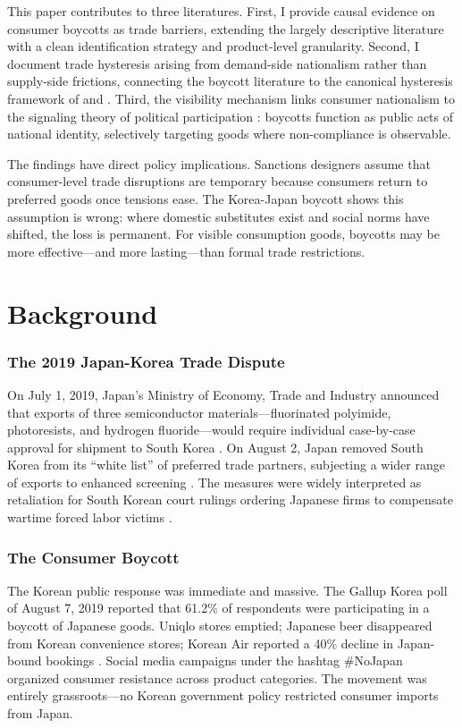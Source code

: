 \documentclass[12pt]{article}
\begin{document}
This paper contributes to three literatures. First, I provide causal evidence on consumer boycotts as trade barriers, extending the largely descriptive literature \citep{pandya2011trade, heilmann2016political, fuchs2015understanding} with a clean identification strategy and product-level granularity. Second, I document trade hysteresis arising from demand-side nationalism rather than supply-side frictions, connecting the boycott literature to the canonical hysteresis framework of \citet{baldwin1988hysteresis} and \citet{dixit1989entry}. Third, the visibility mechanism links consumer nationalism to the signaling theory of political participation \citep{dellavigna2017voting}: boycotts function as public acts of national identity, selectively targeting goods where non-compliance is observable.

The findings have direct policy implications. Sanctions designers assume that consumer-level trade disruptions are temporary because consumers return to preferred goods once tensions ease. The Korea-Japan boycott shows this assumption is wrong: where domestic substitutes exist and social norms have shifted, the loss is permanent. For visible consumption goods, boycotts may be more effective---and more lasting---than formal trade restrictions.


\section{Background}

\subsubsection*{The 2019 Japan-Korea Trade Dispute} On July 1, 2019, Japan's Ministry of Economy, Trade and Industry announced that exports of three semiconductor materials---fluorinated polyimide, photoresists, and hydrogen fluoride---would require individual case-by-case approval for shipment to South Korea \citep{reuters2019japan}. On August 2, Japan removed South Korea from its ``white list'' of preferred trade partners, subjecting a wider range of exports to enhanced screening \citep{bbc2019japan}. The measures were widely interpreted as retaliation for South Korean court rulings ordering Japanese firms to compensate wartime forced labor victims \citep{chung2019politics}.

\subsubsection*{The Consumer Boycott} The Korean public response was immediate and massive. The Gallup Korea poll of August 7, 2019 reported that 61.2\% of respondents were participating in a boycott of Japanese goods. Uniqlo stores emptied; Japanese beer disappeared from Korean convenience stores; Korean Air reported a 40\% decline in Japan-bound bookings \citep{lee2020boycott}. Social media campaigns under the hashtag \#NoJapan organized consumer resistance across product categories. The movement was entirely grassroots---no Korean government policy restricted consumer imports from Japan.
\end{document}
